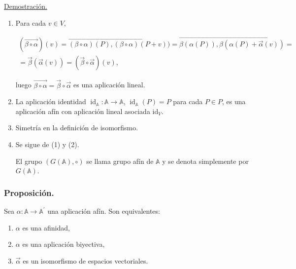 \documentclass[12pt, a4paper, ones, notitlepage, openany,titlepage]{article}
\begin{document}
\underline{Demostración.}
\begin{enumerate}
\item Para cada $v \in V$,

\begin{gather*}
(\overrightarrow{\beta \circ \alpha})(v)=\overrightarrow{(\beta \circ \alpha)(P),(\beta \circ \alpha)(P+v)})=\overrightarrow{\beta(\alpha(P)), \beta(\alpha(P)+\vec{\alpha}(v))}=\\=\vec{\beta}(\vec{\alpha}(v))=(\vec{\beta} \circ \vec{\alpha})(v),
\end{gather*}

luego $\overrightarrow{\beta \circ \alpha}=\vec{\beta} \circ \vec{\alpha}$ es una aplicación lineal.

\item La aplicación identidad $\operatorname{id}_{\mathbb{A}}: \mathbb{A} \rightarrow \mathbb{A}$, $\operatorname{id}_{\mathbb{A}}(P)=P$ para cada $P \in P$, es una aplicación afín con aplicación lineal asociada $\mathrm{id}_{V}$.

\item Simetría en la definición de isomorfismo.

\item Se sigue de (1) y (2).

El grupo $(G(\mathbb{A}), \circ)$ se llama grupo afín de $\mathbb{A}$ y se denota simplemente por $G(\mathbb{A})$.
\end{enumerate}

\subsubsection{Proposición.}
	Sea $\alpha: \mathbb{A} \rightarrow \mathbb{A}^{\prime}$ una aplicación afín. Son equivalentes:
	\begin{enumerate}
		\item $\alpha$ es una afinidad,
		
		\item $\alpha$ es una aplicación biyectiva,
		
		\item $\vec{\alpha}$ es un isomorfismo de espacios vectoriales.
	\end{enumerate}
\end{document}
